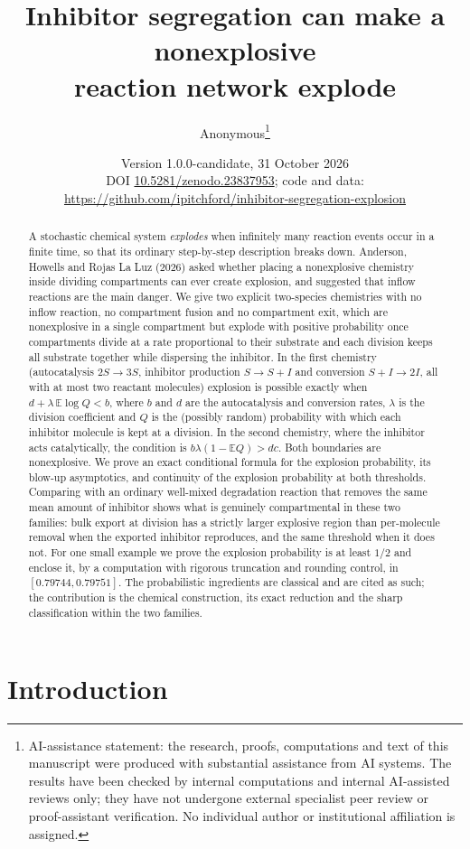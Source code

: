\documentclass[11pt,a4paper]{article}
\title{Inhibitor segregation can make a nonexplosive\\ reaction network explode}
\author{Anonymous\thanks{AI-assistance statement: the research, proofs, computations and text of this manuscript were produced with substantial assistance from AI systems. The results have been checked by internal computations and internal AI-assisted reviews only; they have not undergone external specialist peer review or proof-assistant verification. No individual author or institutional affiliation is assigned.}}
\date{Version 1.0.0-candidate, 31 October 2026\\[2pt]\small DOI \href{https://doi.org/10.5281/zenodo.23837953}{10.5281/zenodo.23837953}; code and data: \url{https://github.com/ipitchford/inhibitor-segregation-explosion}}
\numberwithin{equation}{section}
\theoremstyle{definition}\newtheorem{definition}[theorem]{Definition}
\theoremstyle{remark}\newtheorem{remark}[theorem]{Remark}\newtheorem{example}[theorem]{Example}
\newcommand{\E}{\mathbb E}
\begin{document}
\maketitle
\begin{abstract}
A stochastic chemical system \emph{explodes} when infinitely many reaction events occur in a finite time, so that its ordinary step-by-step description breaks down. Anderson, Howells and Rojas La Luz (2026) asked whether placing a nonexplosive chemistry inside dividing compartments can ever create explosion, and suggested that inflow reactions are the main danger. We give two explicit two-species chemistries with no inflow reaction, no compartment fusion and no compartment exit, which are nonexplosive in a single compartment but explode with positive probability once compartments divide at a rate proportional to their substrate and each division keeps all substrate together while dispersing the inhibitor. In the first chemistry (autocatalysis $2S\to3S$, inhibitor production $S\to S+I$ and conversion $S+I\to2I$, all with at most two reactant molecules) explosion is possible exactly when $d+\lambda\,\E\log Q<b$, where $b$ and $d$ are the autocatalysis and conversion rates, $\lambda$ is the division coefficient and $Q$ is the (possibly random) probability with which each inhibitor molecule is kept at a division. In the second chemistry, where the inhibitor acts catalytically, the condition is $b\lambda(1-\E Q)>dc$. Both boundaries are nonexplosive. We prove an exact conditional formula for the explosion probability, its blow-up asymptotics, and continuity of the explosion probability at both thresholds. Comparing with an ordinary well-mixed degradation reaction that removes the same mean amount of inhibitor shows what is genuinely compartmental in these two families: bulk export at division has a strictly larger explosive region than per-molecule removal when the exported inhibitor reproduces, and the same threshold when it does not. For one small example we prove the explosion probability is at least $1/2$ and enclose it, by a computation with rigorous truncation and rounding control, in $[0.79744,0.79751]$. The probabilistic ingredients are classical and are cited as such; the contribution is the chemical construction, its exact reduction and the sharp classification within the two families.
\end{abstract}
\tableofcontents
\newpage
\section{Introduction}\label{sec:intro}
\end{document}
